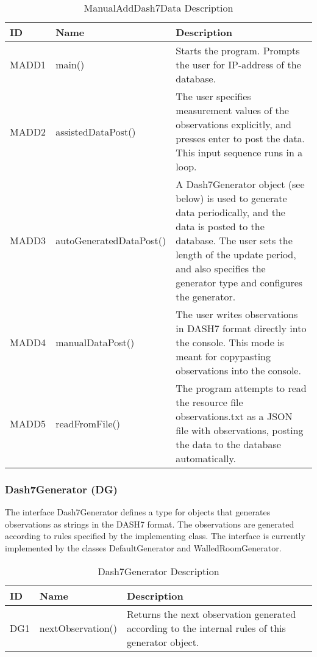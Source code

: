 \documentclass[../document]{subfiles}
\begin{document}
\begin{table}[H]
\caption{ManualAddDash7Data Description}
\centering
\begin{tabularx}{\textwidth}{|L{1.2cm}|L{4cm}|X|}
\hline 
ID
&Name
&Description
\\ \hline MADD1
&main()
&Starts the program. Prompts the user for IP-address of the database.
\\ \hline MADD2
&assistedDataPost()
&The user specifies measurement values of the observations explicitly, and presses enter to post the data. This input sequence runs in a loop.
\\ \hline MADD3
&autoGeneratedDataPost()
&A Dash7Generator object (see below) is used to generate data periodically, and the data is posted to the database. The user sets the length of the update period, and also specifies the generator type and configures the generator.
\\ \hline MADD4
&manualDataPost()
&The user writes observations in \gls{DASH7} format directly into the console. This mode is meant for copypasting observations into the console.
\\ \hline MADD5
&readFromFile()
&The program attempts to read the resource file observations.txt as a \gls{JSON} file with observations, posting the data to the database automatically.

\\ \hline 
\end{tabularx}
\end{table}

\subsubsection{Dash7Generator (DG)}
The interface Dash7Generator defines a type for objects that generates observations as strings in the \gls{DASH7} format. The observations are generated according to rules specified by the implementing class. The interface is currently implemented by the classes DefaultGenerator and WalledRoomGenerator.

\begin{table}[H]
\caption{Dash7Generator Description}
\centering
\begin{tabularx}{\textwidth}{|L{1.2cm}|L{3.5cm}|X|}
\hline ID
&Name
&Description
\\ \hline 
DG1
&nextObservation()
&Returns the next observation generated according to the internal rules of this generator object.
\\ \hline 
\end{tabularx}
\end{table}
\end{document}
